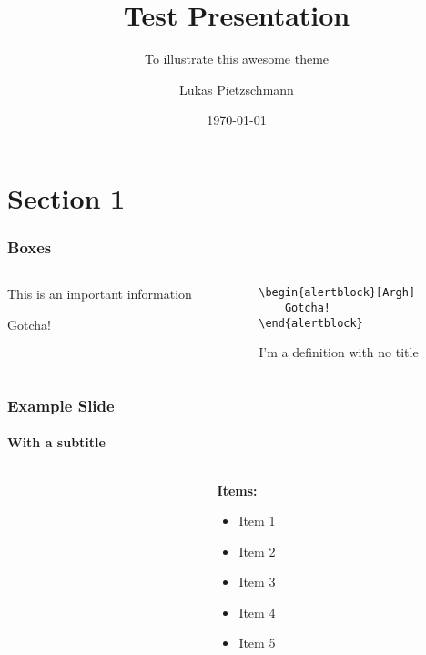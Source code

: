\documentclass[aspectratio=169, usepdftitle=false, xcolor={dvipsnames}]{beamer}
\title{Test Presentation}
\author[Luke]{Lukas Pietzschmann}
\subtitle{To illustrate this awesome theme}
\institute{Institute of Software Engineering and\\Programming Languages}
\date{\today}
\begin{document}
\maketitle

\section{Section 1}
\begin{frame}[fragile]
	\frametitle{Boxes}
	\begin{columns}[t]
		\begin{column}{0.45\textwidth}
			\begin{block}
				This is an important information
			\end{block}
			\begin{alertblock}[Argh]
				Gotcha!
			\end{alertblock}
		\end{column}
		\begin{column}{0.45\textwidth}
			\begin{examples}[Example 1]
				\begin{verbatim}
\begin{alertblock}[Argh]
	Gotcha!
\end{alertblock}
				\end{verbatim}
			\end{examples}
			\begin{definition}
				I'm a definition with no title
			\end{definition}
		\end{column}
	\end{columns}
\end{frame}
\begin{frame}
	\frametitle[Another Title]{Example Slide}
	\framesubtitle{With a subtitle}
	\begin{columns}[t]
		\begin{column}{0.45\textwidth}
			\lipsum[1][1-5]
		\end{column}
		\begin{column}{0.45\textwidth}
			\textbf{Items:}
			\begin{itemize}
				\item Item 1
				\item Item 2
				\item Item 3
				\item Item 4
				\item Item 5
			\end{itemize}
		\end{column}
	\end{columns}
\end{frame}
\end{document}

